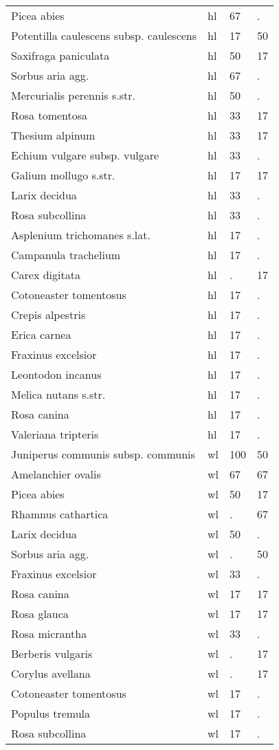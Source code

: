 \begin{longtable}{p{70mm}p{10mm}p{10mm}p{10mm}}
Picea abies&hl&67&.\tabularnewline
Potentilla caulescens subsp. caulescens&hl&17&50\tabularnewline
Saxifraga paniculata&hl&50&17\tabularnewline
Sorbus aria agg.&hl&67&.\tabularnewline
Mercurialis perennis s.str.&hl&50&.\tabularnewline
Rosa tomentosa&hl&33&17\tabularnewline
Thesium alpinum&hl&33&17\tabularnewline
Echium vulgare subsp. vulgare&hl&33&.\tabularnewline
Galium mollugo s.str.&hl&17&17\tabularnewline
Larix decidua&hl&33&.\tabularnewline
Rosa subcollina&hl&33&.\tabularnewline
Asplenium trichomanes s.lat.&hl&17&.\tabularnewline
Campanula trachelium&hl&17&.\tabularnewline
Carex digitata&hl&.&17\tabularnewline
Cotoneaster tomentosus&hl&17&.\tabularnewline
Crepis alpestris&hl&17&.\tabularnewline
Erica carnea&hl&17&.\tabularnewline
Fraxinus excelsior&hl&17&.\tabularnewline
Leontodon incanus&hl&17&.\tabularnewline
Melica nutans s.str.&hl&17&.\tabularnewline
Rosa canina&hl&17&.\tabularnewline
Valeriana tripteris&hl&17&.\tabularnewline
Juniperus communis subsp. communis&wl&100&50\tabularnewline
Amelanchier ovalis&wl&67&67\tabularnewline
Picea abies&wl&50&17\tabularnewline
Rhamnus cathartica&wl&.&67\tabularnewline
Larix decidua&wl&50&.\tabularnewline
Sorbus aria agg.&wl&.&50\tabularnewline
Fraxinus excelsior&wl&33&.\tabularnewline
Rosa canina&wl&17&17\tabularnewline
Rosa glauca&wl&17&17\tabularnewline
Rosa micrantha&wl&33&.\tabularnewline
Berberis vulgaris&wl&.&17\tabularnewline
Corylus avellana&wl&.&17\tabularnewline
Cotoneaster tomentosus&wl&17&.\tabularnewline
Populus tremula&wl&17&.\tabularnewline
Rosa subcollina&wl&17&.\tabularnewline
\bottomrule
 \end{longtable}
  
